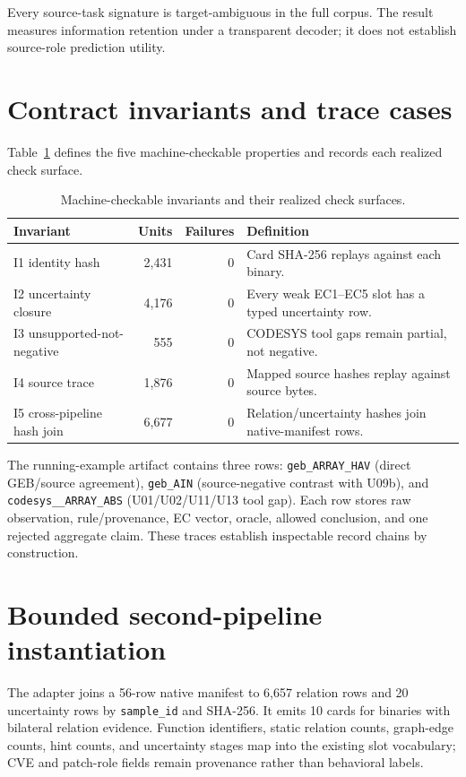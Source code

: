 \documentclass[manuscript,screen,review]{acmart}
\begin{document}
Every source-task signature is target-ambiguous in the full corpus. The result measures information retention under a transparent decoder; it does not establish source-role prediction utility.

\section{Contract invariants and trace cases}

Table~\ref{tab:contract_invariants} defines the five machine-checkable properties and records each realized check surface.

\begin{table}[t]
\centering
\small
\caption{Machine-checkable invariants and their realized check surfaces.}
\label{tab:contract_invariants}
\begin{tabularx}{\textwidth}{>{\raggedright\arraybackslash}p{}rr>{\raggedright\arraybackslash}X}
\toprule
Invariant & Units & Failures & Definition \\
\midrule
I1 identity hash & 2,431 & 0 & Card SHA-256 replays against each binary. \\
I2 uncertainty closure & 4,176 & 0 & Every weak EC1--EC5 slot has a typed uncertainty row. \\
I3 unsupported-not-negative & 555 & 0 & CODESYS tool gaps remain partial, not negative. \\
I4 source trace & 1,876 & 0 & Mapped source hashes replay against source bytes. \\
I5 cross-pipeline hash join & 6,677 & 0 & Relation/uncertainty hashes join native-manifest rows. \\
\bottomrule
\end{tabularx}
\end{table}

The running-example artifact contains three rows: \texttt{geb\_ARRAY\_HAV} (direct GEB/source agreement), \texttt{geb\_AIN} (source-negative contrast with U09b), and \texttt{codesys\_\_ARRAY\_ABS} (U01/U02/U11/U13 tool gap). Each row stores raw observation, rule/provenance, EC vector, oracle, allowed conclusion, and one rejected aggregate claim. These traces establish inspectable record chains by construction.

\section{Bounded second-pipeline instantiation}

The adapter joins a 56-row native manifest to 6{,}657 relation rows and 20 uncertainty rows by \texttt{sample\_id} and SHA-256. It emits 10 cards for binaries with bilateral relation evidence. Function identifiers, static relation counts, graph-edge counts, hint counts, and uncertainty stages map into the existing slot vocabulary; CVE and patch-role fields remain provenance rather than behavioral labels.
\end{document}
